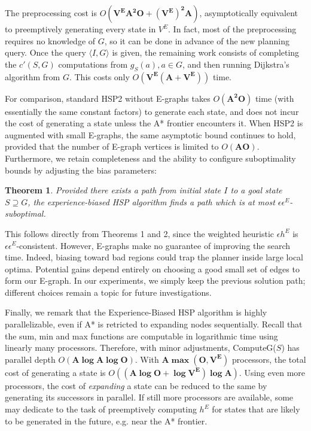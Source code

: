\documentclass[letterpaper]{article}
\newtheorem{thm}{Theorem}
\begin{document}
The preprocessing cost is $O(\mathbf{V^EA^2O + (V^E)^2A})$, asymptotically equivalent to preemptively generating every state in $V^E$.
In fact, most of the preprocessing requires no knowledge of $G$, so it can be done in advance of the new planning query. Once the query $\langle I,G\rangle$ is given, the remaining work consists of completing the $c'(S,G)$ computations from $g_S(a),a\in G$, and then running Dijkstra's algorithm from $G$. This costs only $O(\mathbf{V^E(A + V^E)})$ time.

For comparison, standard HSP2 without E-graphs takes $O(\mathbf{A^2O})$ time (with essentially the same constant factors) to generate each state, and does not incur the cost of generating a state unless the A* frontier encounters it.
When HSP2 is augmented with small E-graphs, the same asymptotic bound continues to hold, provided that the number of E-graph vertices is limited to $O(\mathbf{AO})$. Furthermore, we retain completeness and the ability to configure suboptimality bounds by adjusting the bias parameters:

\begin{thm}
Provided there exists a path from initial state $I$ to a goal state $S\supseteq G$, the experience-biased HSP algorithm finds a path which is at most $\epsilon\epsilon^E$-suboptimal.
\end{thm}

This follows directly from Theorems 1 and 2, since the weighted heuristic $\epsilon h^E$ is $\epsilon \epsilon^E$-consistent.
However, E-graphs make no guarantee of improving the search time. Indeed, biasing toward bad regions could trap the planner inside large local optima.
Potential gains depend entirely on choosing a good small set of edges to form our E-graph.
In our experiments, we simply keep the previous solution path; different choices remain a topic for future investigations.

Finally, we remark that the Experience-Biased HSP algorithm is highly parallelizable, even if A* is retricted to expanding nodes sequentially. Recall that the sum, min and max functions are computable in logarithmic time using linearly many processors. Therefore, with minor adjustments, ComputeG($S$) has parallel depth $O(\mathbf{A\log A\log O})$. With $\mathbf{A\max(O,V^E)}$ processors, the total cost of generating a state is $O(\mathbf{(A\log O + \log V^E)\log A})$. Using even more processors, the cost of \textit{expanding} a state can be reduced to the same by generating its successors in parallel. If still more processors are available, some may dedicate to the task of preemptively computing $h^E$ for states that are likely to be generated in the future, e.g. near the A* frontier.
\end{document}

